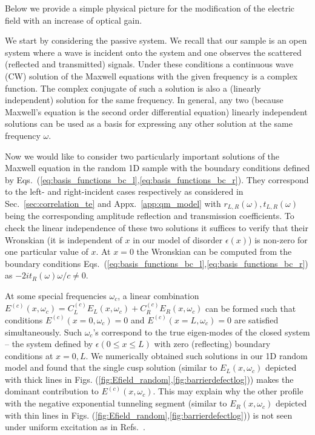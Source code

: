 
Below we provide a simple physical picture for the modification of the electric field with an increase of optical gain. 

We start by considering the passive system. We recall that our sample is an open system where a wave is incident onto the system and one observes the scattered (reflected and transmitted) signals.  Under these conditions a continuous wave (CW) solution of the Maxwell equations with the given frequency is a complex function. The complex conjugate of such a solution is also a (linearly independent) solution for the same frequency. In general, any two (because Maxwell's equation is the second order differential equation) linearly independent solutions can be used as a basis for expressing any other solution at the same frequency $\omega$. 

Now we would like to consider two particularly important solutions of the Maxwell equation in the random 1D sample with the boundary conditions defined by Eqs.~(\ref{eq:basis_functions_bc_l},\ref{eq:basis_functions_bc_r}). They correspond to the left- and right-incident cases respectively as considered in Sec.~\ref{sec:correlation_te} and Appx.~\ref{app:qm_model} with $r_{L,R}(\omega),t_{L,R}(\omega)$ being the corresponding amplitude reflection and transmission coefficients. To check the linear independence of these two solutions it suffices to verify that their Wronskian (it is independent of $x$ in our model of disorder $\epsilon(x)$) is non-zero for one particular value of $x$. At $x=0$ the Wronskian can be computed from the boundary conditions  Eqs.~(\ref{eq:basis_functions_bc_l},\ref{eq:basis_functions_bc_r}) as $-2it_R(\omega)\omega/c\neq 0$.

At some special frequencies $\omega_c$, a linear combination  $E^{(c)}(x,\omega_c)=C_L^{(c)} E_{L}(x,\omega_c)+C_R^{(c)} E_{R}(x,\omega_c)$ can be formed such that conditions $E^{(c)}(x=0,\omega_c)=0$ and $E^{(c)}(x=L,\omega_c)=0$ are satisfied simultaneously. Such $\omega_c$'s  correspond to the true eigen-modes of the closed system -- the system defined by $\epsilon(0\leq x\leq L)$ with zero (reflecting) boundary conditions at $x=0,L$. We numerically obtained such solutions in our 1D random model and found that the single cusp solution (similar to $E_{L}(x,\omega_c)$ depicted with thick lines in Figs. (\ref{fig:Efield_random},\ref{fig:barrierdefectlog})) makes the dominant contribution to $E^{(c)}(x,\omega_c)$. This may explain why the other profile with the negative exponential tunneling segment (similar to $E_{R}(x,\omega_c)$ depicted with thin lines in Figs. (\ref{fig:Efield_random},\ref{fig:barrierdefectlog})) is not seen under uniform excitation as in Refs.~\cite{2002_Jiang_Loc_Modes_Lasing,2002_Sebbah_Vanneste,2005_Vanneste}.

